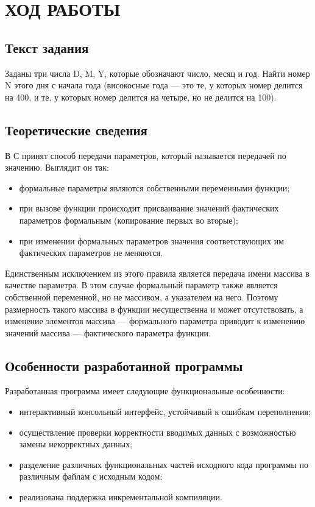 \section{ХОД РАБОТЫ}

\subsection{Текст задания}

Заданы три числа D, M, Y, которые обозначают
число, месяц и год. Найти номер N этого дня с начала года (високосные
года --- это те, у которых номер делится на 400, и те, у которых номер
делится на четыре, но не делится на 100).

\subsection{Теоретические сведения}

В С принят способ передачи параметров, который называется передачей по
значению. Выглядит он так: 

\begin{itemize}
\item формальные параметры являются собственными
  переменными функции;
\item при вызове функции происходит присваивание
  значений фактических параметров формальным (копирование первых во
  вторые);
\item при изменении формальных параметров значения соответствующих
  им фактических параметров не меняются.
\end{itemize}

Единственным исключением из этого правила является передача имени
массива в качестве параметра.
В этом случае формальный параметр также
является собственной переменной, но не массивом, а указателем на
него. Поэтому размерность такого массива в функции несущественна и
может отсутствовать, а изменение элементов массива --- формального
параметра приводит к изменению значений массива --- фактического
параметра функции.

\subsection{Особенности разработанной программы}
Разработанная 
программа имеет следующие функциональные особенности:

\begin{itemize}
\item интерактивный консольный интерфейс, устойчивый к ошибкам переполнения;
\item осуществление проверки корректности вводимых данных с возможностью 
  замены некорректных данных;
\item разделение различных функциональных частей исходного кода программы 
  по различным файлам с исходным кодом;
\item реализована поддержка инкрементальной компиляции.
\end{itemize}

